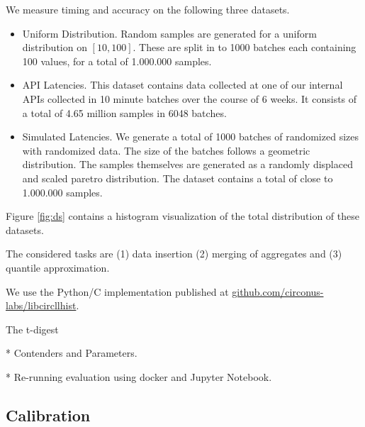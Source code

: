 \documentclass{article}
\theoremstyle{plain}
\theoremstyle{remark}
\begin{document}
We measure timing and accuracy on the following three datasets.

\begin{itemize}
\item Uniform Distribution. Random samples are generated for a uniform distribution on $[10,100]$.
  These are split in to 1000 batches each containing 100 values, for a total of 1.000.000 samples.
\item API Latencies.  This dataset contains data collected at one of our internal APIs
  collected in 10 minute batches over the course of 6 weeks.
  It consists of a total of 4.65 million samples in 6048 batches.
\item Simulated Latencies.
  We generate a total of 1000 batches of randomized sizes with randomized data.
  The size of the batches follows a geometric distribution.
  The samples themselves are generated as a randomly displaced and scaled paretro distribution.
  The dataset contains a total of close to 1.000.000 samples.
\end{itemize}

Figure \ref{fig:ds} contains a histogram visualization of the total distribution of these datasets.



The considered tasks are (1) data insertion (2) merging of aggregates and (3) quantile approximation.


We use the Python/C implementation published at \url{github.com/circonus-labs/libcircllhist}.

The t-digest

* Contenders and Parameters.

* Re-running evaluation using docker and Jupyter Notebook.


\clearpage
\subsection{Calibration}
\end{document}
